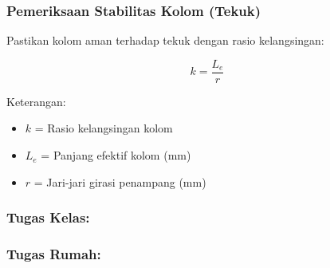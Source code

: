 \documentclass[../main.tex]{subfiles}
\begin{document}
\begin{frame}[c,mycolor=digiPH_ocean,mytitle=center,dark]
	\frametitle{Pemeriksaan Stabilitas Kolom (Tekuk)}

	Pastikan kolom aman terhadap tekuk dengan rasio kelangsingan:

	\begin{equation}
		k = \frac{L_e}{r}
	\end{equation}

	\vspace{0.5cm}

	Keterangan:
	\begin{itemize}
		\item $k$ = Rasio kelangsingan kolom
		\item $L_e$ = Panjang efektif kolom (mm)
		\item $r$ = Jari-jari girasi penampang (mm)
	\end{itemize}
\end{frame}



\begin{frame}[c,mycolor=digiPH_leaf,mytitle=standard,dark]
	\frametitle{Tugas Kelas:}
\end{frame}



\begin{frame}[c,mycolor=digiPH_ocean,mytitle=center,dark]
	\frametitle{Tugas Rumah:}
\end{frame}
\end{document}
